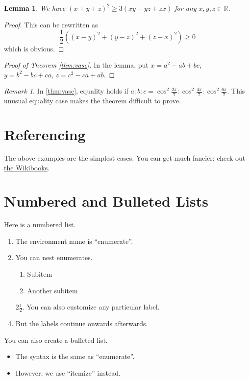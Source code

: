 \documentclass[11pt]{article}
\theoremstyle{plain} %
\newtheorem{lemma}[theorem]{Lemma}
\theoremstyle{definition}
\theoremstyle{remark}
\newtheorem{remark}{Remark}
\newcommand{\half}{\frac{1}{2}}
\begin{document}
\begin{lemma}
	We have $\left( x+y+z \right)^2 \ge 3(xy+yz+zx)$ for any $x,y,z \in \mathbb R$.
\end{lemma}
\begin{proof}
	This can be rewritten as
	\[ \half\left( (x-y)^2+(y-z)^2+(z-x)^2 \right) \ge 0 \]
	which is obvious.
\end{proof}

\begin{proof}
	[Proof of Theorem \ref{thm:vasc}]
	In the lemma, put $x=a^2-ab+bc$, $y=b^2-bc+ca$, $z=c^2-ca+ab$.
\end{proof}

\begin{remark}
	In \autoref{thm:vasc}, equality holds if
	$a : b : c = \cos^2 \frac{2\pi}{7} : \cos^2 \frac{4\pi}{7} : \cos^2 \frac{6\pi}{7}$.
	This unusual equality case makes the theorem difficult to prove.
\end{remark}


\section{Referencing}
The above examples are the simplest cases.
You can get much fancier: check out
\href{http://en.wikibooks.org/wiki/LaTeX/Labels_and_Cross-referencing}{the Wikibooks}.

\section{Numbered and Bulleted Lists}
Here is a numbered list.
\begin{enumerate}
	\item The environment name is ``enumerate''.
	\item You can nest enumerates.
		\begin{enumerate}
			\item Subitem
			\item Another subitem
		\end{enumerate}
	\item[$2 \half$.] You can also customize any particular label.
	\item But the labels continue onwards afterwards.
\end{enumerate}

\bigskip

You can also create a bulleted list.
\begin{itemize}
	\item The syntax is the same as ``enumerate''.
	\item However, we use ``itemize'' instead.
\end{itemize}
\end{document}
